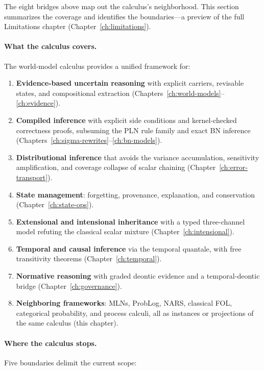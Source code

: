 The eight bridges above map out the calculus's neighborhood.  This
section summarizes the coverage and identifies the boundaries---a
preview of the full Limitations chapter (Chapter~\ref{ch:limitations}).

\paragraph{What the calculus covers.}
The world-model calculus provides a unified framework for:

\begin{enumerate}
\item \textbf{Evidence-based uncertain reasoning} with explicit
  carriers, revisable states, and compositional extraction
  (Chapters~\ref{ch:world-models}--\ref{ch:evidence}).
\item \textbf{Compiled inference} with explicit side conditions and
  kernel-checked correctness proofs, subsuming the PLN rule family
  and exact BN inference (Chapters~\ref{ch:sigma-rewrites}--\ref{ch:bn-models}).
\item \textbf{Distributional inference} that avoids the variance
  accumulation, sensitivity amplification, and coverage collapse of
  scalar chaining (Chapter~\ref{ch:error-transport}).
\item \textbf{State management}: forgetting, provenance,
  explanation, and conservation
  (Chapter~\ref{ch:state-ops}).
\item \textbf{Extensional and intensional inheritance} with a
  typed three-channel model refuting the classical scalar mixture
  (Chapter~\ref{ch:intensional}).
\item \textbf{Temporal and causal inference} via the temporal
  quantale, with free transitivity theorems
  (Chapter~\ref{ch:temporal}).
\item \textbf{Normative reasoning} with graded deontic evidence and
  a temporal-deontic bridge (Chapter~\ref{ch:governance}).
\item \textbf{Neighboring frameworks}: MLNs, ProbLog, NARS,
  classical FOL, categorical probability, and process calculi, all
  as instances or projections of the same calculus (this chapter).
\end{enumerate}

\paragraph{Where the calculus stops.}
Five boundaries delimit the current scope:

